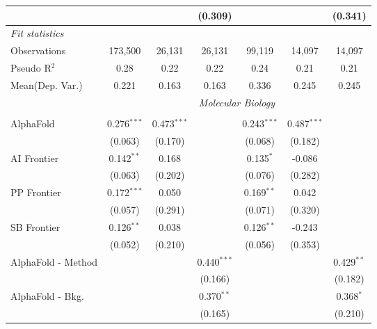 \begin{tabular}{lcccccc}
                        &               &               & (0.309)       &               &               & (0.341)\\   
   \midrule
   \emph{Fit statistics}\\
   Observations         & 173,500       & 26,131        & 26,131        & 99,119        & 14,097        & 14,097\\  
   Pseudo R$^2$         & 0.28          & 0.22          & 0.22          & 0.24          & 0.21          & 0.21\\  
Mean(Dep. Var.) & 0.221 & 0.163 & 0.163 & 0.336 & 0.245 & 0.245 \\
   
 & \multicolumn{6}{c}{\textit{Molecular Biology}} \\ \\
   AlphaFold            & 0.276$^{***}$ & 0.473$^{***}$ &                & 0.243$^{***}$ & 0.487$^{***}$ &   \\   
                        & (0.063)       & (0.170)       &                & (0.068)       & (0.182)       &   \\   
   AI Frontier          & 0.142$^{**}$  & 0.168         &                & 0.135$^{*}$   & -0.086        &   \\   
                        & (0.063)       & (0.202)       &                & (0.076)       & (0.282)       &   \\   
   PP Frontier          & 0.172$^{***}$ & 0.050         &                & 0.169$^{**}$  & 0.042         &   \\   
                        & (0.057)       & (0.291)       &                & (0.071)       & (0.320)       &   \\   
   SB Frontier          & 0.126$^{**}$  & 0.038         &                & 0.126$^{**}$  & -0.243        &   \\   
                        & (0.052)       & (0.210)       &                & (0.056)       & (0.353)       &   \\   
   AlphaFold - Method   &               &               & 0.440$^{***}$  &               &               & 0.429$^{**}$\\   
                        &               &               & (0.166)        &               &               & (0.182)\\   
   AlphaFold - Bkg.     &               &               & 0.370$^{**}$   &               &               & 0.368$^{*}$\\   
                        &               &               & (0.165)        &               &               & (0.210)\\   

\end{tabular}
